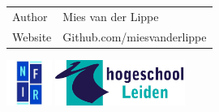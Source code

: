 \begin{titlepage}

\thetitle
\theauthor
\titlepageversion

\vfill

\begin{tabular}{ll}
	Author & Mies van der Lippe \\[2ex]
	Website & Github.com/miesvanderlippe \\[2ex]
\end{tabular}

\vspace{15mm}

\includegraphics[height=1.5cm]{img/nfir.jpg}
\hfill
\includegraphics[height=1.5cm]{img/hsl.png}	

\end{titlepage}